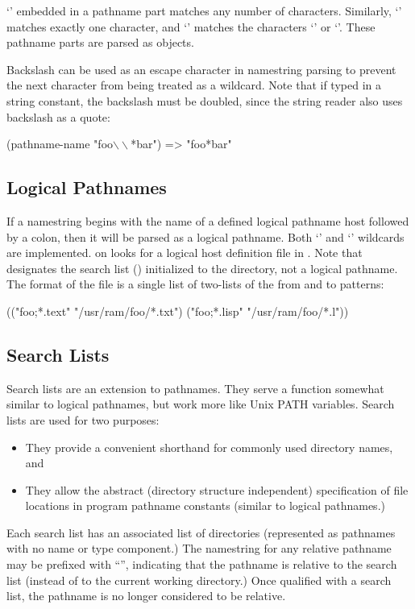 `\code{*}' embedded in a pathname part matches any number of characters.
Similarly, `' matches exactly one character, and `\code{[a,b]}'
matches the characters `' or `'.  These pathname parts are
parsed as  objects.

Backslash can be used as an escape character in namestring
parsing to prevent the next character from being treated as a wildcard.  Note
that if typed in a string constant, the backslash must be doubled, since the
string reader also uses backslash as a quote:

\begin{example}
(pathname-name "foo\(\backslash\backslash\)*bar") => "foo*bar"
\end{example}


\subsection{Logical Pathnames}
\label{logical-pathnames}

If a namestring begins with the name of a defined logical pathname
host followed by a colon, then it will be parsed as a logical
pathname.  Both `\code{*}' and `\code{**}' wildcards are implemented.
 on  looks for a
logical host definition file in
. Note that 
designates the search list () initialized to the
\cmucl{}  directory, not a logical pathname.  The format of
the file is a single list of two-lists of the from and to patterns:

\begin{example}
(("foo;*.text" "/usr/ram/foo/*.txt")
 ("foo;*.lisp" "/usr/ram/foo/*.l"))
\end{example}


\subsection{Search Lists}
\label{search-lists}

Search lists are an extension to \clisp{} pathnames.  They serve a function
somewhat similar to \clisp{} logical pathnames, but work more like Unix PATH
variables.  Search lists are used for two purposes:
\begin{itemize}
\item They provide a convenient shorthand for commonly used directory names,
and

\item They allow the abstract (directory structure independent) specification
of file locations in program pathname constants (similar to logical pathnames.)
\end{itemize}
Each search list has an associated list of directories (represented as
pathnames with no name or type component.)  The namestring for any relative
pathname may be prefixed with ``\code{:}'', indicating that the
pathname is relative to the search list  (instead of to the current
working directory.)  Once qualified with a search list, the pathname is no
longer considered to be relative.

